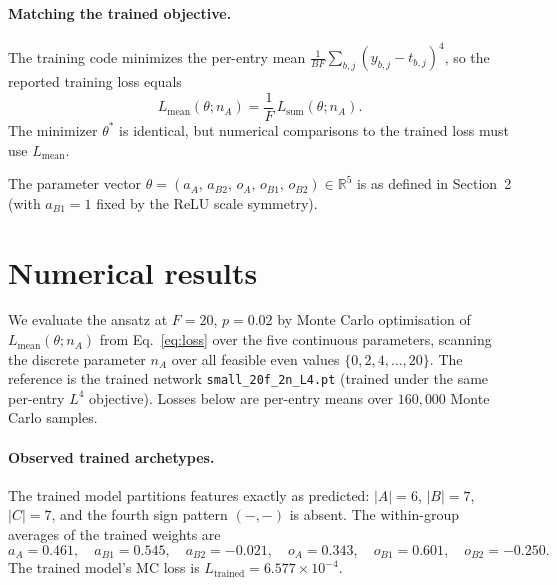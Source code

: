 \documentclass[11pt]{article}
\begin{document}
\paragraph{Matching the trained objective.} The training code minimizes the per-entry mean $\tfrac{1}{B F}\sum_{b, j}(y_{b,j} - t_{b,j})^4$, so the reported training loss equals
\begin{equation*}
L_{\mathrm{mean}}(\theta; n_A) = \frac{1}{F}\, L_{\mathrm{sum}}(\theta; n_A).
\end{equation*}
The minimizer $\theta^*$ is identical, but numerical comparisons to the trained loss must use $L_{\mathrm{mean}}$.

The parameter vector $\theta = (a_A, \, a_{B2}, \, o_A, \, o_{B1}, \, o_{B2}) \in \mathbb{R}^5$ is as defined in Section~2 (with $a_{B1} = 1$ fixed by the ReLU scale symmetry).

\section{Numerical results}

We evaluate the ansatz at $F = 20$, $p = 0.02$ by Monte Carlo optimisation of $L_{\mathrm{mean}}(\theta; n_A)$ from Eq.~\eqref{eq:loss} over the five continuous parameters, scanning the discrete parameter $n_A$ over all feasible even values $\{0, 2, 4, \ldots, 20\}$.
The reference is the trained network \texttt{small\_20f\_2n\_L4.pt} (trained under the same per-entry $L^4$ objective).
Losses below are per-entry means over $160{,}000$ Monte Carlo samples.

\paragraph{Observed trained archetypes.}
The trained model partitions features exactly as predicted: $|A| = 6$, $|B| = 7$, $|C| = 7$, and the fourth sign pattern $(-, -)$ is absent.
The within-group averages of the trained weights are
\begin{equation*}
a_A = 0.461, \quad a_{B1} = 0.545, \quad a_{B2} = -0.021, \quad o_A = 0.343, \quad o_{B1} = 0.601, \quad o_{B2} = -0.250.
\end{equation*}
The trained model's MC loss is $L_{\mathrm{trained}} = 6.577 \times 10^{-4}$.
\end{document}
